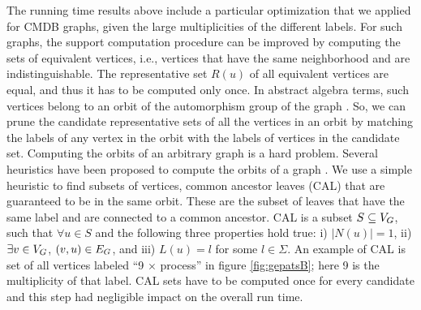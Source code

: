 The running time results above include a particular optimization that we
applied for CMDB graphs, given the large multiplicities of the different
labels. For such graphs, the 
support computation procedure can be improved by computing the sets of
equivalent vertices, i.e., vertices that have the same neighborhood and
are indistinguishable. The representative set $R(u)$ of all equivalent
vertices are equal, and thus it has to be computed only once.  In
abstract algebra terms, such vertices belong to an orbit of the
automorphism group of the graph \cite{orbits}.  So, we can prune the
candidate representative sets of all the vertices in an orbit by
matching the labels of any vertex in the orbit with the labels of
vertices in the candidate set. Computing the orbits of an arbitrary
graph is a hard problem. Several heuristics have been proposed to
compute the orbits of a graph \cite{Everett}.  We use a simple heuristic
to find subsets of vertices, common ancestor leaves (CAL) that are
guaranteed to be in the same orbit. These are the subset of leaves that
have the same label and are connected to a common ancestor.  CAL is a
subset $S \subseteq V_G$, such that $\forall u \in S$ and the following
three properties hold true: i) $|N(u)|=1$, ii) $\exists v \in V_G$,
$(v,u) \in E_G$, and  iii) $L(u) = l$  for some $l \in \Sigma$.
An example of CAL is set of all vertices labeled ``9 $\times$ process'' in
figure \ref{fig:gepatsB}; here 9 is the multiplicity of that label. 
CAL sets have to be computed once for every
candidate and this step had negligible impact on the overall run time. 


